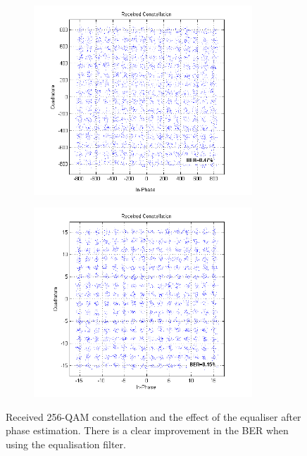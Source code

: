\documentclass[12pt,a4paper,openright]{report}
\begin{document}
 \begin{figure}[H]
 \centering
 \begin{subfigure}{.45\textwidth}
   \centering
   \includegraphics[width=0.9\textwidth]{rcvdNOEQ.png}
   \label{fig:ConstBeforeFilt}
    \end{subfigure}%
 \begin{subfigure}{.45\textwidth}
   \includegraphics[width=0.9\textwidth]{rcvdEQ.png}
     \label{fig:ConstAfterFilt}
    \end{subfigure}
 \caption[Received 256-QAM constellation and the effect of the equaliser]{Received 256-QAM constellation and the effect of the equaliser after phase estimation. There is a clear improvement in the BER when using the equalisation filter.}
    \label{fig:RcvdQAMsignal}
 \end{figure} 
\end{document}
